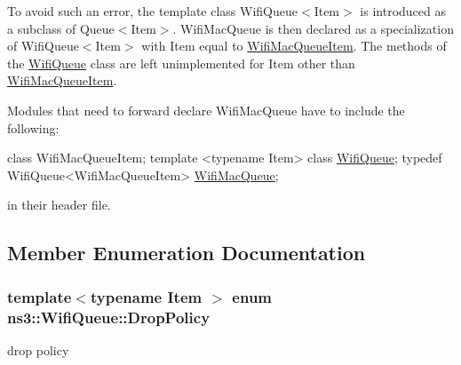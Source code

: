 To avoid such an error, the template class Wifi\+Queue$<$\+Item$>$ is introduced as a subclass of Queue$<$\+Item$>$. Wifi\+Mac\+Queue is then declared as a specialization of Wifi\+Queue$<$\+Item$>$ with Item equal to \hyperlink{classns3_1_1WifiMacQueueItem}{Wifi\+Mac\+Queue\+Item}. The methods of the \hyperlink{classns3_1_1WifiQueue}{Wifi\+Queue} class are left unimplemented for Item other than \hyperlink{classns3_1_1WifiMacQueueItem}{Wifi\+Mac\+Queue\+Item}.

Modules that need to forward declare Wifi\+Mac\+Queue have to include the following\+:


\begin{DoxyCode}
\textcolor{keyword}{class }WifiMacQueueItem;
\textcolor{keyword}{template} <\textcolor{keyword}{typename} Item> \textcolor{keyword}{class }\hyperlink{classns3_1_1WifiQueue_a888b5859d593427165427461dd1f93a9}{WifiQueue};
\textcolor{keyword}{typedef} WifiQueue<WifiMacQueueItem> \hyperlink{namespacens3_a3ca96bcdf02c0e7cacea08ca62ead54c}{WifiMacQueue};
\end{DoxyCode}


in their header file. 

\subsection{Member Enumeration Documentation}
\subsubsection[{\texorpdfstring{Drop\+Policy}{DropPolicy}}]{\setlength{\rightskip}{0pt plus 5cm}template$<$typename Item $>$ enum {\bf ns3\+::\+Wifi\+Queue\+::\+Drop\+Policy}}\hypertarget{classns3_1_1WifiQueue_a31cd8cafb8f3f8d162183f2a1754eddc}{}\label{classns3_1_1WifiQueue_a31cd8cafb8f3f8d162183f2a1754eddc}


drop policy 


